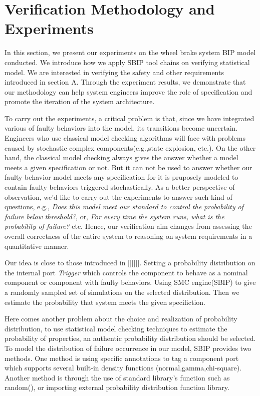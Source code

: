 

\section{Verification Methodology and Experiments}

In this section, we present our experiments on the wheel brake system BIP model conducted. We introduce how we apply SBIP tool chains on verifying statistical model. We are interested in verifying the safety and other requirements introduced in section A. Through the experiment results, we demonstrate that our methodology can help system engineers improve the role of specification and promote the iteration of the system architecture.

To carry out the experiments, a critical problem is that, since we have integrated various of faulty behaviors into the model, its transitions become uncertain. Engineers who use classical model checking algorithms will face with problems caused by stochastic complex components(e.g.,state explosion, etc.). On the other hand, the classical model checking always gives the answer whether a model meets a given specification or not. But it can not be used to answer whether our faulty behavior model meets any specification for it is pruposely modeled to contain faulty behaviors triggered stochastically. As a better perspective of observation, we'd like to carry out the experiments to answer such kind of questions, e.g., \emph{Does this model meet our standard to control the probability of failure below threshold?}, or, \emph{For every time the system runs, what is the probability of failure?} etc. Hence, our verification aim changes from assessing the overall correctness of the entire system to reasoning on system requirements in a quantitative manner.

Our idea is close to those introduced in [][][]. Setting a probability distribution on the internal port \emph{Trigger} which controls the component to behave as a nominal component or component with faulty behaviors. Using SMC engine(SBIP) to give a randomly sampled set of simulations on the selected distribution. Then we estimate the probability that system meets the given specifiction. 

Here comes another problem about the choice and realization of probability distribution, to use statistical model checking techniques to estimate the probability of properties, an authentic probability distribution should be selected. To model the distribution of failure occurrence in our model, SBIP provides two methods. One method is using specific annotations to tag a component port which supports several built-in density functions (normal,gamma,chi-square). Another method is through the use of standard library's function such as random(), or importing external probability distribution function library.

